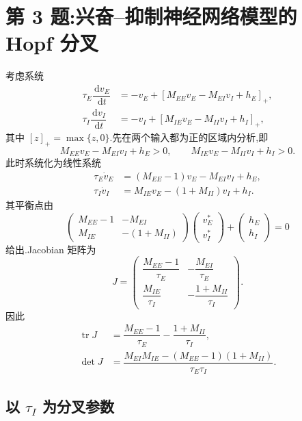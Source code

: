\documentclass[oneside]{ctexart}
\newcommand{\dd}{\,\mathrm{d}}
\begin{document}
\section{第 3 题:兴奋--抑制神经网络模型的 Hopf 分叉}

考虑系统
\begin{align}
    \tau_E\dfrac{\dd v_E}{\dd t}
    &=-v_E+[M_{EE}v_E-M_{EI}v_I+h_E]_+,\\
    \tau_I\dfrac{\dd v_I}{\dd t}
    &=-v_I+[M_{IE}v_E-M_{II}v_I+h_I]_+,
\end{align}
其中 $[z]_+=\max\{z,0\}$.先在两个输入都为正的区域内分析,即
\[
    M_{EE}v_E-M_{EI}v_I+h_E>0,
    \qquad
    M_{IE}v_E-M_{II}v_I+h_I>0.
\]
此时系统化为线性系统
\begin{align}
    \tau_E\dot v_E&=(M_{EE}-1)v_E-M_{EI}v_I+h_E,\\
    \tau_I\dot v_I&=M_{IE}v_E-(1+M_{II})v_I+h_I.
\end{align}
其平衡点由
\begin{equation}
    \begin{pmatrix}
        M_{EE}-1 & -M_{EI}\\
        M_{IE} & -(1+M_{II})
    \end{pmatrix}
    \begin{pmatrix}v_E^*\\v_I^*\end{pmatrix}
    +
    \begin{pmatrix}h_E\\h_I\end{pmatrix}=0
\end{equation}
给出.Jacobian 矩阵为
\begin{equation}
    J=\begin{pmatrix}
        \dfrac{M_{EE}-1}{\tau_E} & -\dfrac{M_{EI}}{\tau_E}\\[1.2ex]
        \dfrac{M_{IE}}{\tau_I} & -\dfrac{1+M_{II}}{\tau_I}
    \end{pmatrix}.
\end{equation}
因此
\begin{align}
    \operatorname{tr}J
    &=\dfrac{M_{EE}-1}{\tau_E}-\dfrac{1+M_{II}}{\tau_I},\\
    \det J
    &=\dfrac{M_{EI}M_{IE}-(M_{EE}-1)(1+M_{II})}{\tau_E\tau_I}.
\end{align}

\subsection*{以 $\tau_I$ 为分叉参数}
\end{document}
